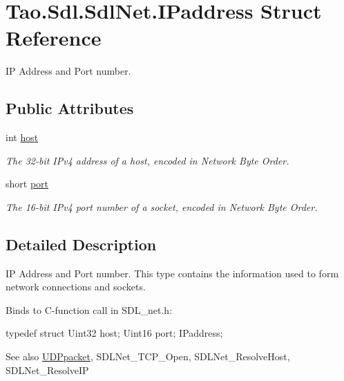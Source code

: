 \hypertarget{struct_tao_1_1_sdl_1_1_sdl_net_1_1_i_paddress}{
\section{Tao.Sdl.SdlNet.IPaddress Struct Reference}
\label{struct_tao_1_1_sdl_1_1_sdl_net_1_1_i_paddress}
}


IP Address and Port number.  


\subsection*{Public Attributes}
\begin{DoxyCompactItemize}
\item 
int \hyperlink{struct_tao_1_1_sdl_1_1_sdl_net_1_1_i_paddress_aa491b12a09f8f4001630a535f8280a63}{host}
\begin{DoxyCompactList}\small\item\em The 32-\/bit IPv4 address of a host, encoded in Network Byte Order. \item\end{DoxyCompactList}\item 
short \hyperlink{struct_tao_1_1_sdl_1_1_sdl_net_1_1_i_paddress_ac07531607885b2bd9f0510a252d7387e}{port}
\begin{DoxyCompactList}\small\item\em The 16-\/bit IPv4 port number of a socket, encoded in Network Byte Order. \item\end{DoxyCompactList}\end{DoxyCompactItemize}


\subsection{Detailed Description}
IP Address and Port number. This type contains the information used to form network connections and sockets. 

Binds to C-\/function call in SDL\_\-net.h: 
\begin{DoxyCode}
                    typedef struct {
                                Uint32 host;
                                Uint16 port;
                    } IPaddress;
\end{DoxyCode}
 

\begin{DoxySeeAlso}{See also}
\hyperlink{struct_tao_1_1_sdl_1_1_sdl_net_1_1_u_d_ppacket}{UDPpacket}, SDLNet\_\-TCP\_\-Open, SDLNet\_\-ResolveHost, SDLNet\_\-ResolveIP


\end{DoxySeeAlso}


